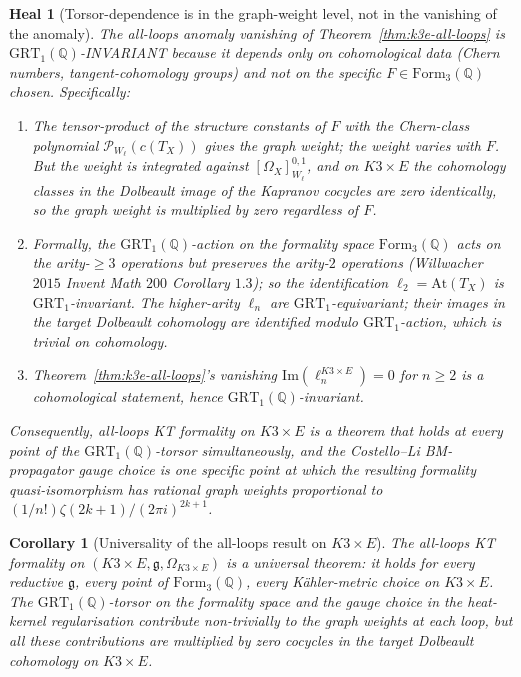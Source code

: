 \documentclass[11pt]{article}
\newtheorem{corollary}[theorem]{Corollary}
\newtheorem{heal}[theorem]{Heal}
\providecommand{\At}{\mathrm{At}}
\providecommand{\Om}{\Omega}
\providecommand{\fg}{\mathfrak{g}}
\providecommand{\QQ}{\mathbb{Q}}
\providecommand{\GRT}{\mathrm{GRT}}
\providecommand{\Form}{\mathrm{Form}}
\begin{document}
\begin{heal}[Torsor-dependence is in the graph-weight level, not in
the vanishing of the anomaly]
\label{heal:grt-invariance}
The all-loops anomaly vanishing of Theorem~\ref{thm:k3e-all-loops}
is $\GRT_1(\QQ)$-INVARIANT because it depends only on
cohomological data (Chern numbers, tangent-cohomology groups) and
not on the specific $F \in \Form_3(\QQ)$ chosen.  Specifically:

\begin{enumerate}[label=\textup{(\arabic*)}]
\item The tensor-product of the structure constants of $F$ with
the Chern-class polynomial $\mathcal P_{W_\ell}(c(T_X))$ gives the
graph weight; the weight varies with $F$.  But the weight is
integrated against $[\Om_X]^{0,1}_{W_\ell}$, and on $K3 \times E$
the cohomology classes in the Dolbeault image of the Kapranov
cocycles are zero identically, so the graph weight is multiplied
by zero regardless of $F$.
\item Formally, the $\GRT_1(\QQ)$-action on the formality space
$\Form_3(\QQ)$ acts on the arity-$\geq 3$ operations but
preserves the arity-$2$ operations (Willwacher $2015$
\emph{Invent Math} $200$ Corollary $1.3$); so the
identification $\ell_2 = \At(T_X)$ is $\GRT_1$-invariant.  The
higher-arity $\ell_n$ are $\GRT_1$-equivariant; their images in
the target Dolbeault cohomology are identified modulo
$\GRT_1$-action, which is trivial on cohomology.
\item Theorem~\ref{thm:k3e-all-loops}'s vanishing
$\mathrm{Im}(\ell_n^{K3 \times E}) = 0$ for $n \geq 2$ is a
cohomological statement, hence $\GRT_1(\QQ)$-invariant.
\end{enumerate}

Consequently, all-loops KT formality on $K3 \times E$ is a
theorem that holds at every point of the $\GRT_1(\QQ)$-torsor
simultaneously, and the Costello--Li BM-propagator gauge choice is
one specific point at which the resulting formality quasi-isomorphism
has rational graph weights proportional to $(1/n!)\zeta(2k+1)/(2\pi i)^{2k+1}$.
\end{heal}

\begin{corollary}[Universality of the all-loops result on
$K3 \times E$]
\label{cor:k3e-universal}
\ClaimStatusTheorem
The all-loops KT formality on $(K3 \times E, \fg, \Om_{K3\times E})$
is a universal theorem: it holds for every reductive $\fg$, every
point of $\Form_3(\QQ)$, every K\"ahler-metric choice on $K3 \times E$.
The $\GRT_1(\QQ)$-torsor on the formality space and the gauge
choice in the heat-kernel regularisation contribute non-trivially
to the graph weights at each loop, but all these contributions are
multiplied by zero cocycles in the target Dolbeault cohomology on
$K3 \times E$.
\end{corollary}
\end{document}
